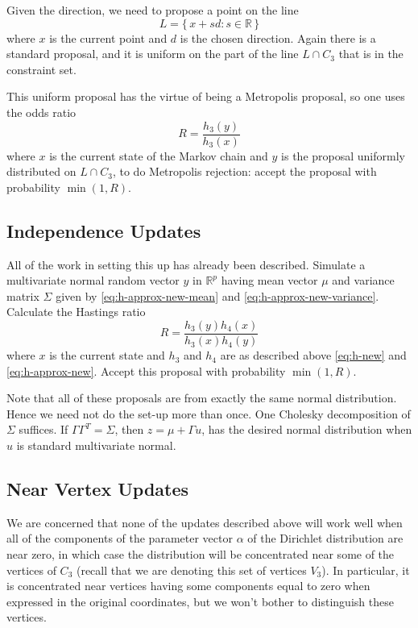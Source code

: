 \documentclass[11pt]{article}
\newcommand{\real}{\mathbb{R}}
\newcommand{\set}[1]{\{\, #1 \,\}}
\begin{document}
Given the direction, we need to propose a point on the line
$$
   L = \set{ x + s d : s \in \real }
$$
where $x$ is the current point and $d$ is the chosen direction.  Again
there is a standard proposal, and it is uniform on the part of the line
$L \cap C_3$ that is in the constraint set.

This uniform proposal has the virtue of being a Metropolis proposal,
so one uses the odds ratio
\begin{equation} \label{eq:metropolis-ratio}
   R = \frac{h_3(y)}{h_3(x)}
\end{equation}
where $x$ is the current state of the Markov chain and $y$ is the proposal
uniformly distributed on $L \cap C_3$, to do Metropolis rejection: accept
the proposal with probability $\min(1, R)$.

\subsection{Independence Updates}

All of the work in setting this up has already been described.  Simulate
a multivariate normal random vector $y$ in $\real^p$ having mean vector $\mu$
and variance matrix $\Sigma$ given by \eqref{eq:h-approx-new-mean}
and \eqref{eq:h-approx-new-variance}.  Calculate the Hastings ratio
$$
    R = \frac{h_3(y) h_4(x)}{h_3(x) h_4(y)}
$$
where $x$ is the current state and $h_3$ and $h_4$ are as described above
\eqref{eq:h-new} and \eqref{eq:h-approx-new}.  Accept this proposal
with probability $\min(1, R)$.

Note that all of these proposals are from exactly the same normal distribution.
Hence we need not do the set-up more than once.  One Cholesky decomposition
of $\Sigma$ suffices.  If $\Gamma \Gamma^T = \Sigma$,
then $z = \mu + \Gamma u$, has the desired normal distribution when $u$
is standard multivariate normal.

\subsection{Near Vertex Updates}

We are concerned that none of the updates described above will work well
when all of the components of the parameter vector $\alpha$ of the Dirichlet
distribution are near zero, in which case the distribution will be concentrated
near some of the vertices of $C_3$ (recall that we are denoting this set
of vertices $V_3$).  In particular, it is concentrated near vertices having
some components equal to zero when expressed in the original coordinates,
but we won't bother to distinguish these vertices.
\end{document}
